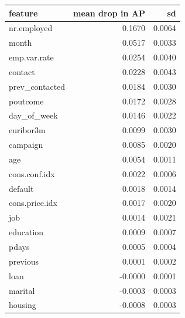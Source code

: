 \begin{tabular}{lrr}
\toprule
feature & mean drop in AP & sd \\
\midrule
nr.employed & 0.1670 & 0.0064 \\
month & 0.0517 & 0.0033 \\
emp.var.rate & 0.0254 & 0.0040 \\
contact & 0.0228 & 0.0043 \\
prev\_contacted & 0.0184 & 0.0030 \\
poutcome & 0.0172 & 0.0028 \\
day\_of\_week & 0.0146 & 0.0022 \\
euribor3m & 0.0099 & 0.0030 \\
campaign & 0.0085 & 0.0020 \\
age & 0.0054 & 0.0011 \\
cons.conf.idx & 0.0022 & 0.0006 \\
default & 0.0018 & 0.0014 \\
cons.price.idx & 0.0017 & 0.0020 \\
job & 0.0014 & 0.0021 \\
education & 0.0009 & 0.0007 \\
pdays & 0.0005 & 0.0004 \\
previous & 0.0001 & 0.0002 \\
loan & -0.0000 & 0.0001 \\
marital & -0.0003 & 0.0003 \\
housing & -0.0008 & 0.0003 \\
\bottomrule
\end{tabular}